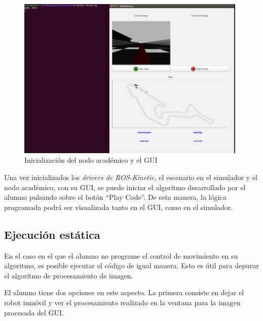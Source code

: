 \begin{figure}[H]
  \begin{center}
    \includegraphics[width=0.98\textwidth]{figures/init_na_chrono.png}
		\caption{Inicialización del nodo académico y el GUI}
		\label{fig.inaGch}
		\end{center}
\end{figure}

Una vez inicializados los \textit{drivers de ROS-Kinetic}, el escenario en el simulador y el nodo académico, con su GUI, se puede iniciar el algoritmo desarrollado por el alumno pulsando sobre el botón ``Play Code''. De esta manera, la lógica programada podrá ser visualizada tanto en el GUI, como en el simulador.
 
\subsection{Ejecución estática}
En el caso en el que el alumno no programe el control de movimiento en su algoritmo, es posible ejecutar el código de igual manera. Esto es útil para depurar el algoritmo de procesamiento de imagen. 

El alumno tiene dos opciones en este aspecto. La primera consiste en dejar el robot inmóvil y ver el procesamiento realizado en la ventana para la imagen procesada del GUI. 

